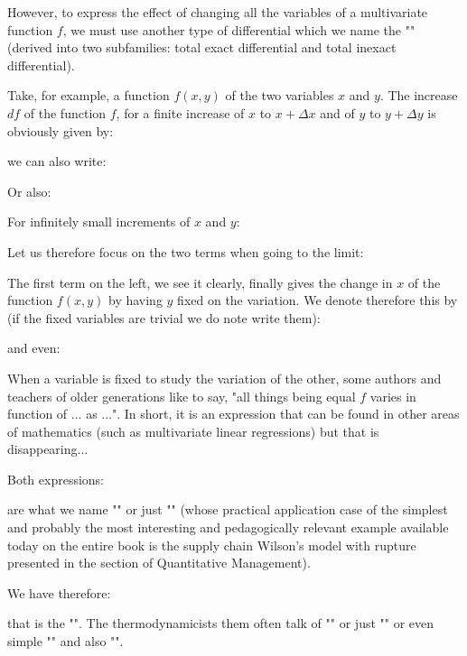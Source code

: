 	However, to express the effect of changing all the variables of a multivariate function $f$, we must use another type of differential which we name the "" (derived into two subfamilies: total exact differential and total inexact differential).
	
	Take, for example, a function $f(x, y)$ of the two variables $x$ and $y$. The increase $df$ of the function $f$, for a finite increase of $x$ to $x+\Delta x$ and of $y$ to $y+\Delta y$ is obviously given by:
	
	we can also write:
	
	Or also:
	
	For infinitely small increments of $x$ and $y$:
	
	Let us therefore focus on the two terms when going to the limit:
	
	The first term on the left, we see it clearly, finally gives the change in $x$ of the function $f(x, y)$ by having $y$ fixed on the variation. We denote therefore this by (if the fixed variables are trivial we do note write them):
	
	and even:
	
	\begin{tcolorbox}[title=Remark,colframe=black,arc=10pt]
When a variable is fixed to study the variation of the other, some authors and teachers of older generations like to say, "all things being equal $f$ varies in function of ... as ...". In short, it is an expression that can be found in other areas of mathematics (such as multivariate linear regressions) but that is disappearing...
	\end{tcolorbox}
	Both expressions:
	
	are what we name "" or just "\label{partial derivative}" (whose practical application case of the simplest and probably the most interesting and pedagogically relevant example available today on the entire book is the supply chain Wilson's model with rupture presented in the section of Quantitative Management).
	
	We have therefore:
	
	that is the "". The thermodynamicists them often talk of "\label{total exact differential}" or just "" or even simple "" and also "".
	

